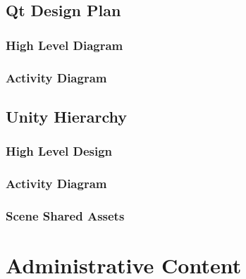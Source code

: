 \documentclass[a4paper,10pt]{article}
\begin{document}
	\subsection{Qt Design Plan}
		\subsubsection{High Level Diagram}
		\subsubsection{Activity Diagram}
	\subsection{Unity Hierarchy}
		\subsubsection{High Level Design}
		\subsubsection{Activity Diagram}
		\subsubsection{Scene Shared Assets}
		
\pagebreak

\section{Administrative Content}
\end{document}
